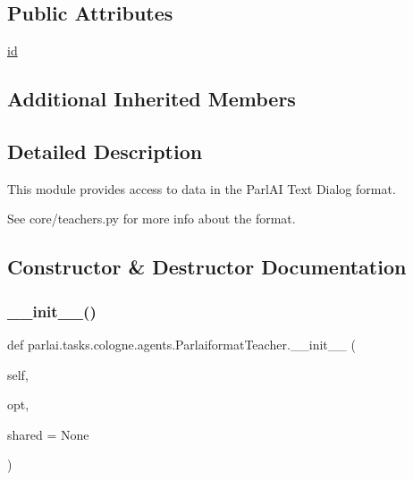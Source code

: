 \subsection*{Public Attributes}
\begin{DoxyCompactItemize}
\item 
\hyperlink{classparlai_1_1tasks_1_1cologne_1_1agents_1_1ParlaiformatTeacher_a3dc8423e1360d4027beb36f3b62287c6}{id}
\end{DoxyCompactItemize}
\subsection*{Additional Inherited Members}


\subsection{Detailed Description}
\begin{DoxyVerb}This module provides access to data in the ParlAI Text Dialog format.

See core/teachers.py for more info about the format.
\end{DoxyVerb}
 

\subsection{Constructor \& Destructor Documentation}
\mbox{\label{classparlai_1_1tasks_1_1cologne_1_1agents_1_1ParlaiformatTeacher_ad9d9559b0ee3eb828922727fa79dcae8}} 
\subsubsection{\texorpdfstring{\+\_\+\+\_\+init\+\_\+\+\_\+()}{\_\_init\_\_()}}
{\footnotesize\ttfamily def parlai.\+tasks.\+cologne.\+agents.\+Parlaiformat\+Teacher.\+\_\+\+\_\+init\+\_\+\+\_\+ (\begin{DoxyParamCaption}\item[{}]{self,  }\item[{}]{opt,  }\item[{}]{shared = {\ttfamily None} }\end{DoxyParamCaption})}




